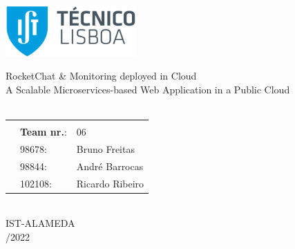 \thispagestyle {empty}
\includegraphics[width=5cm]{./pictures/IST_A_RGB_POS.png}
\begin{center}
\vspace{5.0cm}
%
{\FontLb RocketChat \& Monitoring deployed in Cloud} \\
\vspace{0.2cm}
%
{\FontMn A Scalable Microservices-based Web Application in a Public Cloud} \\
\vspace{1.0cm}
{\FontLn \tlangCourse} \\
\vspace*{1.0cm}
\begin{center}
\begin{tabular}{r@{~}l l}
    \multicolumn{3}{c}{\bfseries\textbf{ }} \\
    & \textbf{Team nr.}: & 06 \\
    & 98678: & Bruno Freitas \\
    & 98844: & André Barrocas \\
    & 102108: & Ricardo Ribeiro \\ %
\end{tabular}
\end{center}
\vspace*{2.0cm}
{\FontMb \tlangDegree} \\
{\FontMb IST-ALAMEDA} \\
\vspace{1.5cm}
{/2022} \\
\end{center}